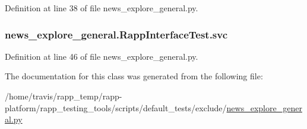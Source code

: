 Definition at line 38 of file news\-\_\-explore\-\_\-general.\-py.

\hypertarget{classnews__explore__general_1_1RappInterfaceTest_a27223e0e013957a70c1e6975582c2e89}{
\subsubsection[{svc}]{\setlength{\rightskip}{0pt plus 5cm}news\-\_\-explore\-\_\-general.\-Rapp\-Interface\-Test.\-svc}}\label{classnews__explore__general_1_1RappInterfaceTest_a27223e0e013957a70c1e6975582c2e89}


Definition at line 46 of file news\-\_\-explore\-\_\-general.\-py.



The documentation for this class was generated from the following file\-:\begin{DoxyCompactItemize}
\item 
/home/travis/rapp\-\_\-temp/rapp-\/platform/rapp\-\_\-testing\-\_\-tools/scripts/default\-\_\-tests/exclude/\hyperlink{news__explore__general_8py}{news\-\_\-explore\-\_\-general.\-py}\end{DoxyCompactItemize}
